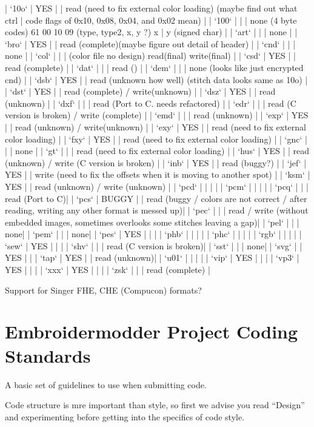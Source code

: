 \documentclass{report}
\begin{document}
| `10o` | YES   |  | read (need to fix external color loading) (maybe find out what ctrl | code flags of 0x10, 0x08, 0x04, and 0x02 mean) |
| `100` |  |  | none (4 byte codes) 61 00 10 09 (type, type2, x, y ?) x | y (signed char) |
| `art` |  |  | none |
| `bro` | YES   |  | read (complete)(maybe figure out detail of header) |
| `cnd` |  |  | none |
| `col` |  |  | (color file no design) read(final) write(final) |
| `csd` | YES   |  | read (complete) |
| `dat` |  |  | read () |
| `dem` |  |  | none (looks like just encrypted cnd) |
| `dsb` | YES   |  | read (unknown how well) (stitch data looks same as 10o) |
| `dst` | YES   |  | read (complete) / write(unknown) |
| `dsz` | YES   |  | read (unknown) |
| `dxf` |  |  | read (Port to C. needs refactored) |
| `edr` |  |  | read (C version is broken) / write (complete) |
| `emd` |  |  | read (unknown) |
| `exp` | YES   |  | read (unknown) / write(unknown) |
| `exy` | YES   |  | read (need to fix external color loading) |
| `fxy` | YES   |  | read (need to fix external color loading) |
| `gnc` |  |  | none |
| `gt`     |  |  | read (need to fix external color loading) |
| `hus` | YES   |  | read (unknown) / write (C version is broken) |
| `inb` | YES   |  | read (buggy?) |
| `jef` | YES   |  | write (need to fix the offsets when it is moving to another spot) |
| `ksm` | YES   |  | read (unknown) / write (unknown) |
| `pcd` |  |  |  |
| `pcm` |  |  | |
| `pcq` |  |  | read (Port to C)|
| `pcs` | BUGGY |  | read (buggy / colors are not correct / after reading, writing any other format is messed up)|
| `pec` |  |  | read / write (without embedded images, sometimes overlooks some stitches leaving a gap)|
| `pel` |  |  | none|
| `pem` |  |  | none|
| `pes` | YES   |  | |
| `phb` |  |  | |
| `phc` |  |  | |
| `rgb` |  |  | |
| `sew` | YES   |  | |
| `shv` |  |  | read (C version is broken)|
| `sst` |  |  | none|
| `svg` |  | YES   | |
| `tap` | YES   |  | read (unknown)|
| `u01` |  |  | |
| `vip` | YES   |  | |
| `vp3` | YES   |  | |
| `xxx` | YES   |  | |
| `zsk` |  |  | read (complete) |

Support for Singer FHE, CHE (Compucon) formats?

\section{Embroidermodder Project Coding Standards}

A basic set of guidelines to use when submitting code.

Code structure is mre important than style, so
first we advise you read ``Design'' and experimenting
before getting into the specifics of code style.
\end{document}
